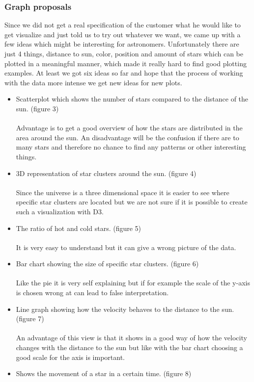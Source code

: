 \documentclass{article}
\begin{document}
\subsubsection{Graph proposals}
Since we did not get a real specification of the customer what he would like to get visualize and just told us to try out whatever we want, we came up with a few ideas which might be interesting for astronomers. Unfortunately there are just 4 things, distance to sun, color, position and amount of stars which can be plotted in a meaningful manner, which made it really hard to find good plotting examples. At least we got six ideas so far and hope that the process of working with the data more intense we get new ideas for new plots.
\begin{itemize}
\item Scatterplot which shows the number of stars compared to the distance of the sun. (figure 3)\\
\\
Advantage is to get a good overview of how the stars are distributed in the area around the sun.
An disadvantage will be the confusion if there are to many stars and therefore no chance to find any patterns or other interesting things.
\item 3D representation of star clusters around the sun. (figure 4)\\
\\
Since the universe is a three dimensional space it is easier to see where specific star clusters are located but we are not sure if it is possible to create such a visualization with D3.
\item The ratio of hot and cold stars. (figure 5)\\
\\
It is very easy to understand but it can give a wrong picture of the data.
\item Bar chart showing the size of specific star clusters. (figure 6)\\
\\
Like the pie it is very self explaining but if for example the scale of the y-axis is chosen wrong at can lead to false interpretation.
\item Line graph showing how the velocity behaves to the distance to the sun. (figure 7)\\
\\
An advantage of this view is that it shows in a good way of how the velocity changes with the distance to the sun but like with the bar chart choosing a good scale for the axis is important.
\item Shows the movement of a star in a certain time. (figure 8)\\
\\

\end{itemize}
\end{document}
